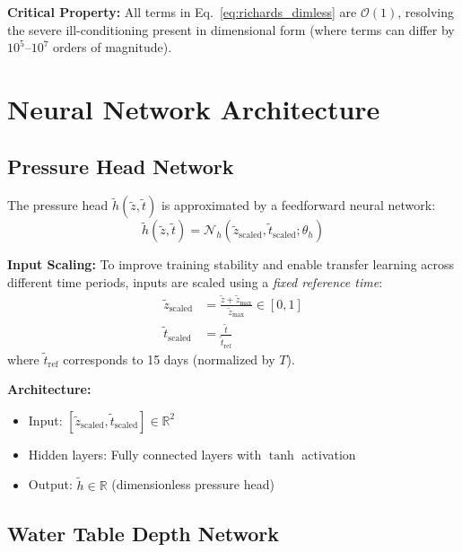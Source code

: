 \documentclass[11pt,a4paper]{article}
\begin{document}
\textbf{Critical Property:} All terms in Eq.~\ref{eq:richards_dimless} are $\mathcal{O}(1)$, resolving the severe ill-conditioning present in dimensional form (where terms can differ by $10^5$--$10^7$ orders of magnitude).

\section{Neural Network Architecture}

\subsection{Pressure Head Network}

The pressure head $\tilde{h}(\tilde{z}, \tilde{t})$ is approximated by a feedforward neural network:
\begin{equation}
    \tilde{h}(\tilde{z}, \tilde{t}) = \mathcal{N}_h(\tilde{z}_{\text{scaled}}, \tilde{t}_{\text{scaled}}; \theta_h)
\end{equation}

\textbf{Input Scaling:} To improve training stability and enable transfer learning across different time periods, inputs are scaled using a \textit{fixed reference time}:
\begin{align}
    \tilde{z}_{\text{scaled}} &= \frac{\tilde{z} + \tilde{z}_{\max}}{\tilde{z}_{\max}} \in [0, 1] \\
    \tilde{t}_{\text{scaled}} &= \frac{\tilde{t}}{\tilde{t}_{\text{ref}}}
\end{align}
where $\tilde{t}_{\text{ref}}$ corresponds to 15 days (normalized by $T$).

\textbf{Architecture:}
\begin{itemize}
    \item Input: $[\tilde{z}_{\text{scaled}}, \tilde{t}_{\text{scaled}}] \in \mathbb{R}^2$
    \item Hidden layers: Fully connected layers with $\tanh$ activation
    \item Output: $\tilde{h} \in \mathbb{R}$ (dimensionless pressure head)
\end{itemize}

\subsection{Water Table Depth Network}
\end{document}
